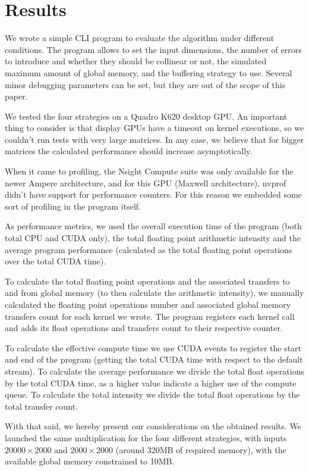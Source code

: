 \section{Results}
\label{sec:results}

We wrote a simple CLI program to evaluate the algorithm under different conditions.
The program allows to set the input dimensions, the number of errors to introduce
and whether they should be collinear or not,
the simulated maximum amount of global memory, and the buffering strategy to use.
Several minor debugging parameters can be set, but they are out of the scope of this paper.

We tested the four strategies on a Quadro K620 desktop GPU. An important thing to consider is that display GPUs have a timeout on kernel executions, so we couldn't run tests with very large matrices. In any case, we believe that for bigger matrices the calculated performance should increase asymptotically.

When it came to profiling, the Nsight Compute suite was only available for the newer Ampere architecture, and for this GPU (Maxwell architecture), nvprof didn't have support for performance counters. For this reason we embedded some sort of profiling in the program itself.

As performance metrics, we used the overall execution time of the program (both total CPU and CUDA only), the total floating point arithmetic intensity and the average program performance (calculated as the total floating point operations over the total CUDA time).

To calculate the total floating point operations and the associated transfers to and from global memory (to then calculate the arithmetic intensity), we manually calculated the floating point operations number and associated global memory transfers count for each kernel we wrote. The program registers each kernel call and adds its float operations and transfers count to their respective counter.

To calculate the effective compute time we use CUDA events to register the start and end of the program (getting the total CUDA time with respect to the default stream).
To calculate the average performance we divide the total float operations by the total CUDA time, as a higher value indicate a higher use of the compute queue.
To calculate the total intensity we divide the total float operations by the total transfer count.

With that said, we hereby present our considerations on the obtained results.
We launched the same multiplication for the four different strategies, with inputs $20000 \times 2000$ and $2000 \times 2000$ (around 320MB of required memory), with the available global memory constrained to 10MB.

